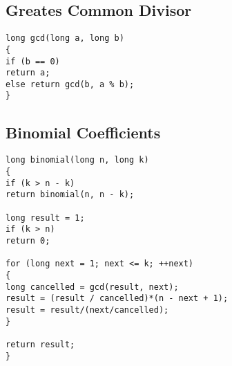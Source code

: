 \subsection{Greates Common Divisor}

\begin{lstlisting}
long gcd(long a, long b)
{
if (b == 0)
return a;
else return gcd(b, a % b);
}
\end{lstlisting}

\subsection{Binomial Coefficients}

\begin{lstlisting}
long binomial(long n, long k)
{
if (k > n - k)
return binomial(n, n - k);

long result = 1;
if (k > n)
return 0;

for (long next = 1; next <= k; ++next)
{
long cancelled = gcd(result, next);
result = (result / cancelled)*(n - next + 1);
result = result/(next/cancelled);
}

return result;
}
\end{lstlisting}